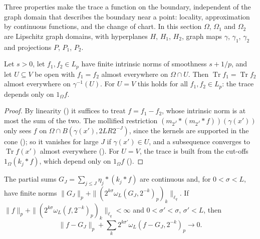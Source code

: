 Three properties make the trace a function on the boundary, independent of the graph domain that
describes the boundary near a point: locality, approximation by continuous functions, and the
change of chart. In this section $\Omega$, $\Omega_1$ and $\Omega_2$ are Lipschitz graph domains,
with hyperplanes $H$, $H_1$, $H_2$, graph maps $\gamma$, $\gamma_1$, $\gamma_2$ and projections $P$,
$P_1$, $P_2$.

\begin{lemma}
\label{lem:trace-locality}
\leanok
{}
Let $s > 0$, let $f_1, f_2 \in L_p$ have finite intrinsic norms of smoothness $s + 1/p$, and let
$U \subseteq V$ be open with $f_1 = f_2$ almost everywhere on $\Omega \cap U$. Then
$\operatorname{Tr} f_1 = \operatorname{Tr} f_2$ almost everywhere on $\gamma^{-1}(U)$. For
$U = V$ this holds for all $f_1, f_2 \in L_p$: the trace depends only on $1_\Omega f$.
\end{lemma}

\begin{proof}
\leanok
By linearity () it suffices to treat $f = f_1 - f_2$, whose intrinsic norm is
at most the sum of the two. The mollified restriction $(m_{2^J} * (m_{2^J} * f))(\gamma(x'))$ only
sees $f$ on $\Omega \cap B(\gamma(x'), 2 L R 2^{-J})$, since the kernels are supported in the cone
(); so it vanishes for large $J$ if $\gamma(x') \in U$, and a
subsequence converges to $\operatorname{Tr} f(x')$ almost everywhere ().
For $U = V$, the trace is built from the cut-offs $1_\Omega (k_j * f)$, which depend only on
$1_\Omega f$ ().
\end{proof}

\begin{lemma}
\label{lem:partial-sums-approx}
\leanok
{}
The partial sums $G_J = \sum_{j \leq J} \eta_j * (k_j * f)$ are continuous and, for $0 < \sigma < L$,
have finite norms $\|G_J\|_p + \|(2^{k\sigma} \omega_L(G_J, 2^{-k})_p)_k\|_{\ell_q}$. If
$\|f\|_p + \|(2^{k\sigma} \omega_L(f, 2^{-k})_p)_k\|_{\ell_q} < \infty$ and $0 < \sigma' < \sigma$,
$\sigma' < L$, then
\[
  \|f - G_J\|_p + \sum_k 2^{k\sigma'} \omega_L(f - G_J, 2^{-k})_p \to 0 .
\]
\end{lemma}

